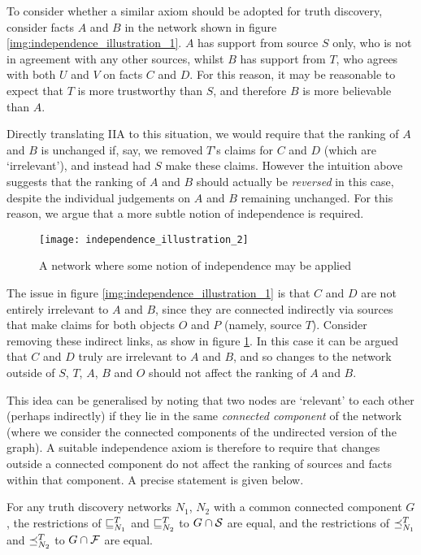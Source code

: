 \documentclass[../main.tex]{subfiles}
\begin{document}
To consider whether a similar axiom should be adopted for truth discovery,
consider facts $A$ and $B$ in the network shown in figure
\ref{img:independence_illustration_1}. $A$ has support from source $S$ only,
who is not in agreement with any other sources, whilst $B$ has support from
$T$, who agrees with both $U$ and $V$ on facts $C$ and $D$. For this reason, it
may be reasonable to expect that $T$ is more trustworthy than $S$, and
therefore $B$ is more believable than $A$.

Directly translating IIA to this situation, we would require that the ranking
of $A$ and $B$ is unchanged if, say, we removed $T$'s claims for $C$ and $D$
(which are `irrelevant'), and instead had $S$ make these claims. However the
intuition above suggests that the ranking of $A$ and $B$ should actually be
\emph{reversed} in this case, despite the individual judgements on $A$ and $B$
remaining unchanged. For this reason, we argue that a more subtle notion of
independence is required.

\begin{figure}
    \centering
    \texttt{[image: independence\_illustration\_2]}
    \caption{
        A network where some notion of independence may be applied
    }
    \label{img:independence_illustration_2}
\end{figure}

The issue in figure \ref{img:independence_illustration_1} is that $C$ and $D$
are not entirely irrelevant to $A$ and $B$, since they are connected indirectly
via sources that make claims for both objects $O$ and $P$ (namely, source $T$).
Consider removing these indirect links, as show in figure
\ref{img:independence_illustration_2}. In this case it can be argued that $C$
and $D$ truly are irrelevant to $A$ and $B$, and so changes to the network
outside of $S$, $T$, $A$, $B$ and $O$ should not affect the ranking of $A$ and
$B$.

This idea can be generalised by noting that two nodes are `relevant' to each
other (perhaps indirectly) if they lie in the same \emph{connected component}
of the network (where we consider the connected components of the undirected
version of the graph). A suitable independence axiom is therefore to require
that changes outside a connected component do not affect the ranking of sources
and facts within that component. A precise statement is given below.

\begin{axiom}
\label{axiom:indep}
For any truth discovery networks $N_1$, $N_2$ with a common connected component
$G$, the restrictions of $\sle_{N_1}^T$ and $\sle_{N_2}^T$ to $G \cap \S$ are
equal, and the restrictions of $\fle_{N_1}^T$ and $\fle_{N_2}^T$ to $G \cap \F$
are equal.
\end{axiom}
\end{document}
